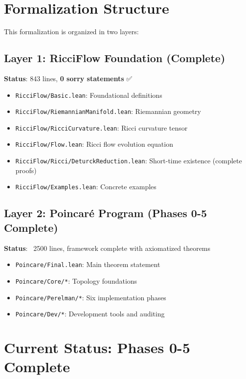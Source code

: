 \section{Formalization Structure}

This formalization is organized in two layers:

\subsection{Layer 1: RicciFlow Foundation (Complete)}

\textbf{Status}: 843 lines, \textbf{0 sorry statements} ✅

\begin{itemize}
\item \texttt{RicciFlow/Basic.lean}: Foundational definitions
\item \texttt{RicciFlow/RiemannianManifold.lean}: Riemannian geometry
\item \texttt{RicciFlow/RicciCurvature.lean}: Ricci curvature tensor
\item \texttt{RicciFlow/Flow.lean}: Ricci flow evolution equation
\item \texttt{RicciFlow/Ricci/DeturckReduction.lean}: Short-time existence (complete proofs)
\item \texttt{RicciFlow/Examples.lean}: Concrete examples
\end{itemize}

\subsection{Layer 2: Poincaré Program (Phases 0-5 Complete)}

\textbf{Status}: ~2500 lines, framework complete with axiomatized theorems

\begin{itemize}
\item \texttt{Poincare/Final.lean}: Main theorem statement
\item \texttt{Poincare/Core/*}: Topology foundations
\item \texttt{Poincare/Perelman/*}: Six implementation phases
\item \texttt{Poincare/Dev/*}: Development tools and auditing
\end{itemize}

\section{Current Status: Phases 0-5 Complete}

